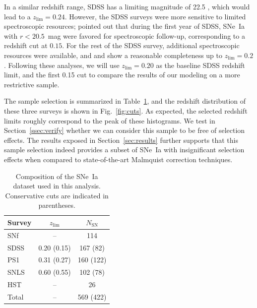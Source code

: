 \documentclass[]{aa}
\newcommand{\nn}[1]{\textcolor[rgb]{0.25, 0.50, 0}{#1}}
\begin{document}
In a similar redshift range, SDSS has a limiting magnitude of 22.5
\citep{dilday2008, sako2008}, which would lead to a $z_{\lim}=0.24$. However,
the SDSS surveys were more sensitive to limited spectroscopic resources;
\cite[][see their Section~2]{kessler2009} pointed out that during the first year
of SDSS, SNe~Ia with $r<20.5$~mag were favored for spectroscopic follow-up,
corresponding to a redshift cut at $0.15$. For the rest of the SDSS survey,
additional spectroscopic resources were available, and \cite{kessler2009} and
\cite{dilday2008} show a reasonable completeness up to $z_{\lim}=0.2$. Following
these analyses, we will use $z_{\lim}=0.20$ as the baseline SDSS redshift limit,
\nn{and the first 0.15 cut to compare the results of our modeling on a more
restrictive sample.}

The sample selection is summarized in Table~\ref{tab:sample}, and the redshift
distribution of these three surveys is shown in Fig.~\ref{fig:cuts}. As
expected, the selected redshift limits roughly correspond to the peak of these
histograms. \nn{We test in Section~\ref{ssec:verify} whether we can consider
this sample to be free of selection effects. The results exposed} in
Section~\ref{sec:results} further supports that this sample selection indeed
provides a subset of SNe~Ia with insignificant selection effects when
compared to state-of-the-art Malmquist correction techniques.

\begin{table}
    \centering
    \caption{Composition of the SNe~Ia dataset used in this analysis.
    Conservative cuts are indicated in parentheses.}
    \label{tab:sample}
    \begin{tabular}{l c c}
        \hline\hline
        Survey & $z_{\lim}$ & $N_{\mathrm{SN}}$ \\
        \hline
        SNf & -- & 114 \\
        SDSS & 0.20 (0.15) & 167 (82)\\
        PS1 & 0.31 (0.27) & 160 (122)\\
        SNLS & 0.60 (0.55) & 102 (78)\\
        HST & -- & 26 \\
        \hline
        Total & -- & 569 (422) \\
        \hline
    \end{tabular}
\end{table}
\end{document}
